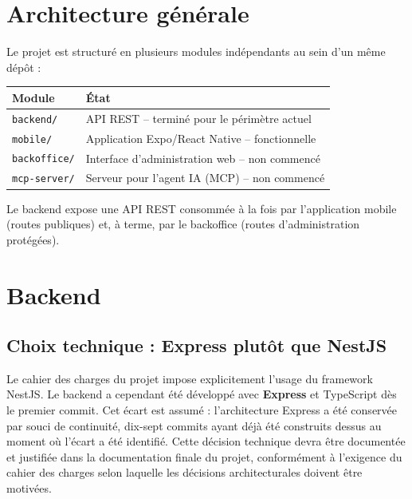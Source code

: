 \documentclass[11pt,a4paper]{article}
\begin{document}
\section{Architecture générale}

Le projet est structuré en plusieurs modules indépendants au sein d'un même dépôt :

\begin{center}
\begin{tabular}{@{}ll@{}}
\toprule
\textbf{Module} & \textbf{État} \\
\midrule
\texttt{backend/} & API REST -- terminé pour le périmètre actuel \\
\texttt{mobile/} & Application Expo/React Native -- fonctionnelle \\
\texttt{backoffice/} & Interface d'administration web -- non commencé \\
\texttt{mcp-server/} & Serveur pour l'agent IA (MCP) -- non commencé \\
\bottomrule
\end{tabular}
\end{center}

Le backend expose une API REST consommée à la fois par l'application mobile (routes publiques) et, à terme, par le backoffice (routes d'administration protégées).

\section{Backend}

\subsection{Choix technique : Express plutôt que NestJS}

Le cahier des charges du projet impose explicitement l'usage du framework NestJS. Le backend a cependant été développé avec \textbf{Express} et TypeScript dès le premier commit. Cet écart est assumé : l'architecture Express a été conservée par souci de continuité, dix-sept commits ayant déjà été construits dessus au moment où l'écart a été identifié. Cette décision technique devra être documentée et justifiée dans la documentation finale du projet, conformément à l'exigence du cahier des charges selon laquelle les décisions architecturales doivent être motivées.
\end{document}
